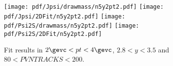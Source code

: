 \begin{figure}[H]
\begin{center}
\texttt{[image: pdf/Jpsi/drawmass/n5y2pt2.pdf]}
\texttt{[image: pdf/Jpsi/2DFit/n5y2pt2.pdf]}
\vspace*{-0.5cm}
\texttt{[image: pdf/Psi2S/drawmass/n5y2pt2.pdf]}
\texttt{[image: pdf/Psi2S/2DFit/n5y2pt2.pdf]}
\vspace*{-0.5cm}
\end{center}
\caption{Fit results in $2\gevc<pt<4\gevc$, $2.8<y<3.5$ and $80<PVNTRACKS<200$.}
\label{Fitn5y2pt2}
\end{figure}
